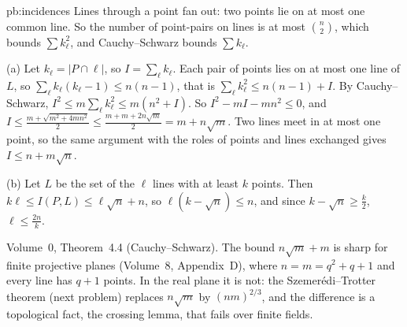 \begin{solution}{pb:incidences}
\idea Lines through a point fan out: two points lie on at most one common line. So the number of point-pairs on lines is at most
$\binom n2$, which bounds $\sum k_\ell^2$, and Cauchy--Schwarz bounds $\sum k_\ell$.

\writeup (a) Let $k_\ell=|P\cap\ell|$, so $I=\sum_\ell k_\ell$. Each pair of points lies on at most one line of $L$, so
$\sum_\ell k_\ell(k_\ell-1)\le n(n-1)$, that is $\sum_\ell k_\ell^2\le n(n-1)+I$. By Cauchy--Schwarz, $I^2\le m\sum_\ell k_\ell^2\le m(n^2+I)$. So
$I^2-mI-mn^2\le0$, and $I\le\frac{m+\sqrt{m^2+4mn^2}}2\le\frac{m+m+2n\sqrt m}2=m+n\sqrt m$. Two lines meet in at most one point, so the same
argument with the roles of points and lines exchanged gives $I\le n+m\sqrt n$.

(b) Let $L$ be the set of the $\ell$ lines with at least $k$ points. Then $k\ell\le I(P,L)\le\ell\sqrt n+n$, so $\ell(k-\sqrt n)\le n$, and since
$k-\sqrt n\ge\frac k2$, $\ell\le\frac{2n}k$.

\tools Volume~0, Theorem~4.4 (Cauchy--Schwarz).
\leads The bound $n\sqrt m+m$ is sharp for finite projective planes (Volume~8, Appendix~D), where $n=m=q^2+q+1$ and every
line has $q+1$ points. In the real plane it is not: the Szemerédi--Trotter theorem (next problem) replaces $n\sqrt m$ by $(nm)^{2/3}$,
and the difference is a topological fact, the crossing lemma, that fails over finite fields.
\end{solution}

